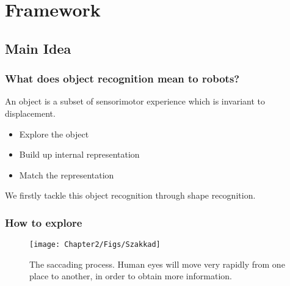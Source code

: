\documentclass{beamer}
\begin{document}
\section{Framework}

\subsection{Main Idea}

\begin{frame}
\frametitle{What does object recognition mean to robots?}

An object  is a subset of sensorimotor experience  which is invariant to displacement.

\end{frame}

\begin{frame}
\begin{itemize}
\item Explore the object
\item Build up internal representation
\item Match the representation 
\end{itemize}

We firstly tackle this object recognition through shape recognition.

\end{frame}


\begin{frame}
\frametitle{How to explore}

\begin{figure}
\centering    
\texttt{[image: Chapter2/Figs/Szakkad]}
\caption{The saccading process. Human eyes will move very rapidly from one place to another, in order to obtain more information.}
\label{fig:2.4}
\end{figure}%

\end{frame}
\end{document}
